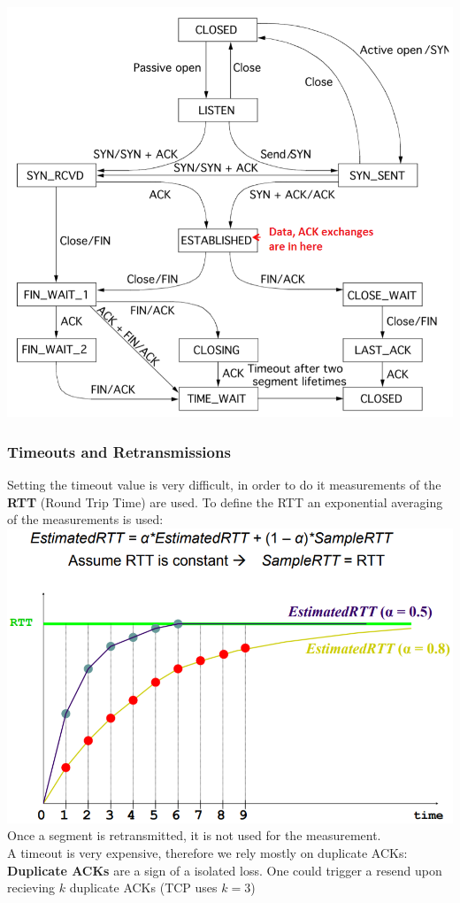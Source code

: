 \documentclass[a4paper, fontsize=8pt, landscape, DIV=1]{scrartcl}
\begin{document}
\begin{multicols*}{4}
		\includegraphics[width=\columnwidth]{images/Transport_Layer/state_transitions.png}
		
		\subsubsection{Timeouts and Retransmissions}	
		Setting the timeout value is very difficult, in order to do it measurements of
		the \textbf{RTT} (Round Trip Time) are used.
		To define the RTT an exponential averaging of the measurements is used:
		\includegraphics[width=\columnwidth]{images/Transport_Layer/RTT_calc.png} 
		Once a segment is retransmitted, it is not used for the measurement.\\
		A timeout is very expensive, therefore we rely mostly on duplicate ACKs:\\
		\textbf{Duplicate ACKs} are a sign of a isolated loss. One could trigger a
		resend upon recieving $k$ duplicate ACKs (TCP uses $k = 3$)
		

\end{multicols*}
\end{document}
